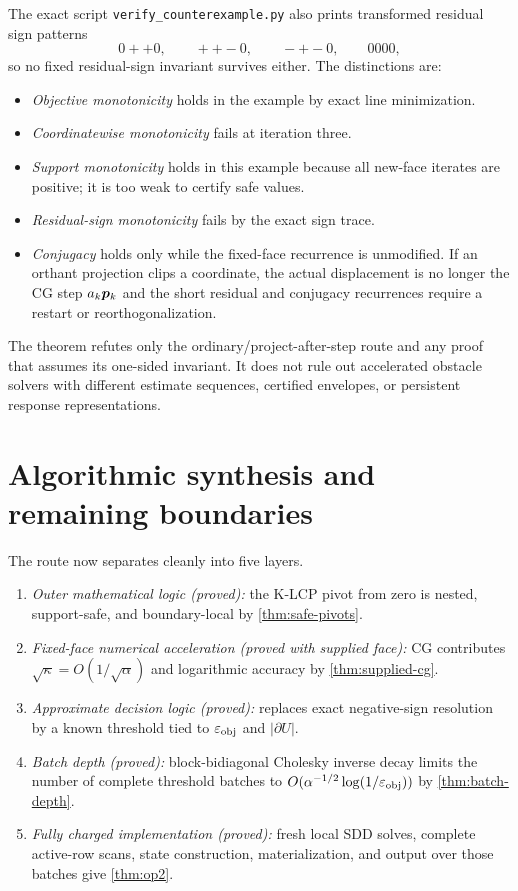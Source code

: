 The exact script \texttt{verify\_counterexample.py} also prints transformed
residual sign patterns
\[
 0{+}{+}0,\qquad {+}{+}{-}0,\qquad {-}{+}{-}0,\qquad0000,
\]
so no fixed residual-sign invariant survives either.  The distinctions are:
\begin{itemize}
\item \emph{Objective monotonicity} holds in the example by exact line
minimization.
\item \emph{Coordinatewise monotonicity} fails at iteration three.
\item \emph{Support monotonicity} holds in this example because all new-face
iterates are positive; it is too weak to certify safe values.
\item \emph{Residual-sign monotonicity} fails by the exact sign trace.
\item \emph{Conjugacy} holds only while the fixed-face recurrence is
unmodified.  If an orthant projection clips a coordinate, the actual
displacement is no longer the CG step $a_k\bm{p}_k$ and the short residual and
conjugacy recurrences require a restart or reorthogonalization.
\end{itemize}

The theorem refutes only the ordinary/project-after-step route and any proof
that assumes its one-sided invariant.  It does not rule out accelerated
obstacle solvers with different estimate sequences, certified envelopes, or
persistent response representations.

\section{Algorithmic synthesis and remaining boundaries}
\label{sec:synthesis}

The route now separates cleanly into five layers.
\begin{enumerate}
\item \emph{Outer mathematical logic (proved):} the K-LCP pivot from zero is
nested, support-safe, and boundary-local by \cref{thm:safe-pivots}.
\item \emph{Fixed-face numerical acceleration (proved with supplied face):}
CG contributes $\sqrt\kappa=O(1/\sqrt\alpha)$ and logarithmic accuracy by
\cref{thm:supplied-cg}.
\item \emph{Approximate decision logic (proved):}
 replaces exact negative-sign resolution by a
known threshold tied to $\varepsilon_{\mathrm{obj}}$ and $|\partial U|$.
\item \emph{Batch depth (proved):} block-bidiagonal Cholesky inverse decay
limits the number of complete threshold batches to
$O(\alpha^{-1/2}\log(1/\varepsilon_{\mathrm{obj}}))$ by \cref{thm:batch-depth}.
\item \emph{Fully charged implementation (proved):} fresh local SDD solves,
complete active-row scans, state construction, materialization, and output
over those batches give \cref{thm:op2}.
\end{enumerate}

